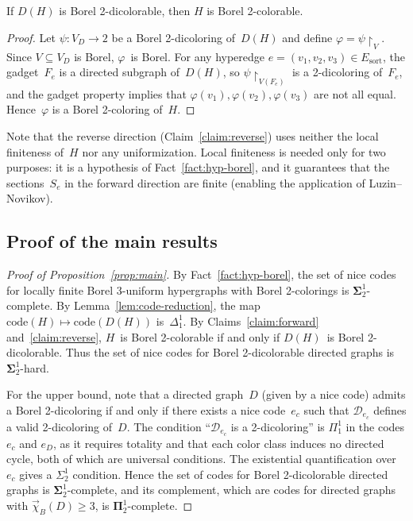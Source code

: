 \documentclass[12pt]{article}
\newcommand{\DD}{\mathcal{D}}
\begin{document}
\begin{claim}\label{claim:reverse}
If $D(H)$ is Borel 2-dicolorable, then $H$ is Borel 2-colorable.
\end{claim}

\begin{proof}
Let $\psi\colon V_D\to 2$ be a Borel 2-dicoloring of~$D(H)$ and define $\varphi = \psi\restriction_V$.
Since $V\subseteq V_D$ is Borel, $\varphi$~is Borel.
For any hyperedge $e=(v_1,v_2,v_3)\in E_{\mathrm{sort}}$, the gadget~$F_e$ is a directed subgraph of~$D(H)$, so $\psi\restriction_{V(F_e)}$ is a 2-dicoloring of~$F_e$, and the gadget property implies that $\varphi(v_1),\varphi(v_2),\varphi(v_3)$ are not all equal.
Hence~$\varphi$ is a Borel 2-coloring of~$H$.
\end{proof}

\begin{remark}\label{rmk:no-lf-reverse}
Note that the reverse direction (Claim~\ref{claim:reverse}) uses neither the local finiteness of~$H$ nor any uniformization.
Local finiteness is needed only for two purposes: it is a hypothesis of Fact~\ref{fact:hyp-borel}, and it guarantees that the sections~$S_e$ in the forward direction are finite (enabling the application of Luzin--Novikov).
\end{remark}

\subsection{Proof of the main results}

\begin{proof}[Proof of Proposition~\ref{prop:main}]
By Fact~\ref{fact:hyp-borel}, the set of nice codes for locally finite Borel 3-uniform hypergraphs with Borel 2-colorings is $\mathbf\Sigma^1_2$-complete.
By Lemma~\ref{lem:code-reduction}, the map $\mathrm{code}(H)\mapsto\mathrm{code}(D(H))$ is~$\Delta^1_1$.
By Claims~\ref{claim:forward} and~\ref{claim:reverse}, $H$~is Borel 2-colorable if and only if $D(H)$~is Borel 2-dicolorable.
Thus the set of nice codes for Borel 2-dicolorable directed graphs is $\mathbf\Sigma^1_2$-hard.

For the upper bound, note that a directed graph~$D$ (given by a nice code) admits a Borel 2-dicoloring if and only if there exists a nice code~$e_c$ such that $\DD_{e_c}$ defines a valid 2-dicoloring of~$D$.
The condition ``$\DD_{e_c}$ is a 2-dicoloring'' is $\Pi^1_1$ in the codes $e_c$ and $e_D$, as it requires totality and that each color class induces no directed cycle, both of which are universal conditions.
The existential quantification over~$e_c$ gives a $\Sigma^1_2$ condition.
Hence the set of codes for Borel 2-dicolorable directed graphs is $\mathbf\Sigma^1_2$-complete, and its complement, which are codes for directed graphs with $\vec\chi_B(D)\geq 3$, is $\mathbf\Pi^1_2$-complete.
\end{proof}
\end{document}
